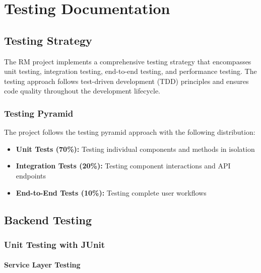 
\chapter{Testing Documentation}

\section{Testing Strategy}

The RM project implements a comprehensive testing strategy that encompasses unit testing, integration testing, end-to-end testing, and performance testing. The testing approach follows test-driven development (TDD) principles and ensures code quality throughout the development lifecycle.

\subsection{Testing Pyramid}

The project follows the testing pyramid approach with the following distribution:
\begin{itemize}
\item \textbf{Unit Tests (70\%):} Testing individual components and methods in isolation
\item \textbf{Integration Tests (20\%):} Testing component interactions and API endpoints
\item \textbf{End-to-End Tests (10\%):} Testing complete user workflows
\end{itemize}

\section{Backend Testing}

\subsection{Unit Testing with JUnit}

\subsubsection{Service Layer Testing}

